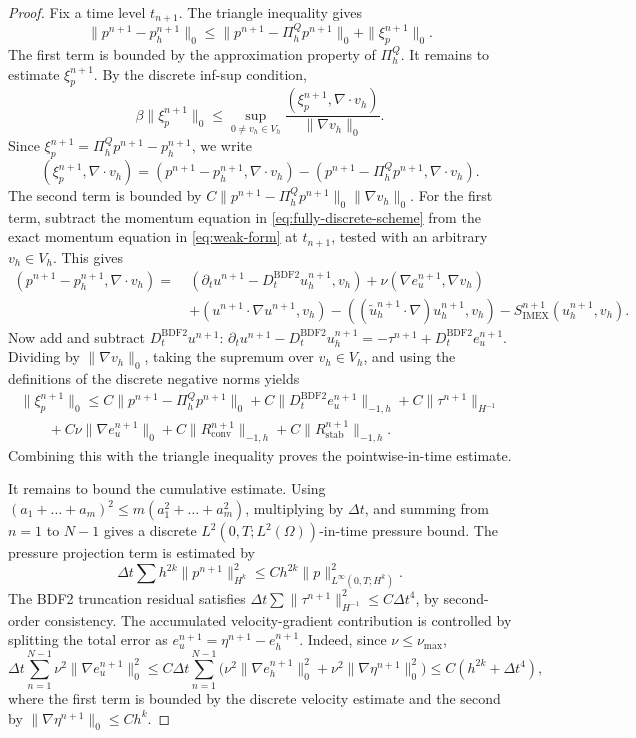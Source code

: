 \documentclass[11pt]{article}
\theoremstyle{remark}\newtheorem{remark}{Remark}
\newcommand{\Vh}{V_h}\newcommand{\Qh}{Q_h}
\newcommand{\Dt}{D_t^{\mathrm{BDF2}}}
\newcommand{\tu}{\tilde u_h}
\newcommand{\Simex}{S_{\mathrm{IMEX}}}
\theoremstyle{plain}
\begin{document}
\begin{proof}
Fix a time level $t_{n+1}$. The triangle inequality gives
\[
\|p^{n+1}-p_h^{n+1}\|_0\le\|p^{n+1}-\Pi_h^Qp^{n+1}\|_0+\|\xi_p^{n+1}\|_0.
\]
The first term is bounded by the approximation property of $\Pi_h^Q$. It remains to estimate $\xi_p^{n+1}$. By the discrete inf-sup condition,
\[\beta\|\xi_p^{n+1}\|_0\le\sup_{0\ne v_h\in\Vh}\frac{(\xi_p^{n+1},\nabla\cdot v_h)}{\|\nabla v_h\|_0}.\]
Since $\xi_p^{n+1}=\Pi_h^Qp^{n+1}-p_h^{n+1}$, we write
\[
(\xi_p^{n+1},\nabla\cdot v_h)=(p^{n+1}-p_h^{n+1},\nabla\cdot v_h)-(p^{n+1}-\Pi_h^Qp^{n+1},\nabla\cdot v_h).
\]
The second term is bounded by $C\|p^{n+1}-\Pi_h^Qp^{n+1}\|_0\|\nabla v_h\|_0$. For the first term, subtract the momentum equation in \eqref{eq:fully-discrete-scheme} from the exact momentum equation in \eqref{eq:weak-form} at $t_{n+1}$, tested with an arbitrary $v_h\in\Vh$. This gives
\[\begin{aligned}
(p^{n+1}-p_h^{n+1},\nabla\cdot v_h)=\ &(\partial_tu^{n+1}-\Dt u_h^{n+1},v_h)+\nu(\nabla e_u^{n+1},\nabla v_h)\\
&+(u^{n+1}\cdot\nabla u^{n+1},v_h)-((\tu^{n+1}\cdot\nabla)u_h^{n+1},v_h)-\Simex^{n+1}(u_h^{n+1},v_h).
\end{aligned}\]
Now add and subtract $\Dt u^{n+1}$: $\partial_tu^{n+1}-\Dt u_h^{n+1}=-\tau^{n+1}+\Dt e_u^{n+1}$. Dividing by $\|\nabla v_h\|_0$, taking the supremum over $v_h\in\Vh$, and using the definitions of the discrete negative norms yields
\begin{multline*}\|\xi_p^{n+1}\|_0\le C\|p^{n+1}-\Pi_h^Qp^{n+1}\|_0+C\|\Dt e_u^{n+1}\|_{-1,h}+C\|\tau^{n+1}\|_{H^{-1}}\\
\qquad +C\nu\|\nabla e_u^{n+1}\|_0+C\|R_{\mathrm{conv}}^{n+1}\|_{-1,h}+C\|R_{\mathrm{stab}}^{n+1}\|_{-1,h}.
\end{multline*}
Combining this with the triangle inequality proves the pointwise-in-time estimate.

It remains to bound the cumulative estimate. Using $(a_1+\dots+a_m)^2\le m(a_1^2+\dots+a_m^2)$, multiplying by $\Delta t$, and summing from $n=1$ to $N-1$ gives a discrete $L^2(0,T;L^2(\Omega))$-in-time pressure bound. The pressure projection term is estimated by
\[
\Delta t\sum h^{2k}\|p^{n+1}\|_{H^k}^2\le Ch^{2k}\|p\|_{L^\infty(0,T;H^k)}^2.
\]
The BDF2 truncation residual satisfies $\Delta t\sum\|\tau^{n+1}\|_{H^{-1}}^2\le C\Delta t^4$, by second-order consistency. The accumulated velocity-gradient contribution is controlled by splitting the total error as $e_u^{n+1}=\eta^{n+1}-e_h^{n+1}$. Indeed, since $\nu\le\nu_{\max}$,
\[\Delta t\sum_{n=1}^{N-1}\nu^2\|\nabla e_u^{n+1}\|_0^2\le C\Delta t\sum_{n=1}^{N-1}\big(\nu^2\|\nabla e_h^{n+1}\|_0^2+\nu^2\|\nabla\eta^{n+1}\|_0^2\big)\le C(h^{2k}+\Delta t^4),\]
where the first term is bounded by the discrete velocity estimate and the second by $\|\nabla\eta^{n+1}\|_0\le Ch^k$.


\end{proof}
\end{document}
